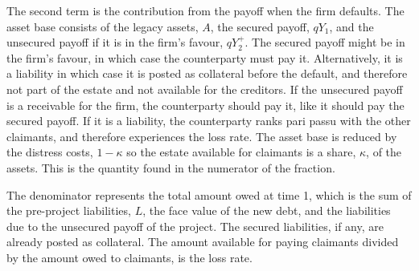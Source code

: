 \documentclass[../main.tex]{subfiles}
\begin{document}
        The second term is the contribution from the payoff when the firm defaults. 
        The asset base consists of the legacy assets, $A$, the secured payoff, $qY_{1}$, 
        and the unsecured payoff if it is in the firm's favour, $qY_{2}^{+}$.
        The secured payoff might be in the firm's favour, in which case the counterparty must pay it. 
        Alternatively, it is a liability in which case it is posted as collateral before the default,
        and therefore not part of the estate and not available for the creditors.
        If the unsecured payoff is a receivable for the firm, 
        the counterparty should pay it, like it should pay the secured payoff.
        If it is a liability, the counterparty ranks pari passu with the other claimants,
        and therefore experiences the loss rate. 
        The asset base is reduced by the distress costs, $1-\kappa$ so the estate available for claimants
        is a share, $\kappa$, of the assets. 
        This is the quantity found in the numerator of the fraction.
        
        The denominator represents the total amount owed at time 1, 
        which is the sum of the pre-project liabilities, $L$, the face value of the new debt, 
        and the liabilities due to the unsecured payoff of the project.
        The secured liabilities, if any, are already posted as collateral.
        The amount available for paying claimants divided by the amount owed to claimants, is the loss rate.
\end{document}
